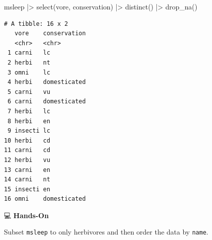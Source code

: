 \documentclass[
  letterpaper,
  DIV=11,
  numbers=noendperiod]{scrreprt}
\newenvironment{Shaded}{\begin{snugshade}}{\end{snugshade}}
\newcommand{\FunctionTok}[1]{\textcolor[rgb]{0.28,0.35,0.67}{#1}}
\newcommand{\NormalTok}[1]{\textcolor[rgb]{0.00,0.23,0.31}{#1}}
\newcommand{\SpecialCharTok}[1]{\textcolor[rgb]{0.37,0.37,0.37}{#1}}
\begin{document}
\begin{tcolorbox}[enhanced jigsaw, colbacktitle=quarto-callout-tip-color!10!white, opacitybacktitle=0.6, breakable, left=2mm, leftrule=.75mm, toprule=.15mm, toptitle=1mm, bottomtitle=1mm, colframe=quarto-callout-tip-color-frame, opacityback=0, coltitle=black, arc=.35mm, titlerule=0mm, colback=white, bottomrule=.15mm, title=\textcolor{quarto-callout-tip-color}{\faLightbulb}\hspace{0.5em}{Answer}, rightrule=.15mm]

\begin{Shaded}
\begin{Highlighting}[]
\NormalTok{msleep }\SpecialCharTok{|\textgreater{}} 
  \FunctionTok{select}\NormalTok{(vore, conservation) }\SpecialCharTok{|\textgreater{}}
  \FunctionTok{distinct}\NormalTok{() }\SpecialCharTok{|\textgreater{}}
  \FunctionTok{drop\_na}\NormalTok{()}
\end{Highlighting}
\end{Shaded}

\begin{verbatim}
# A tibble: 16 x 2
   vore    conservation
   <chr>   <chr>       
 1 carni   lc          
 2 herbi   nt          
 3 omni    lc          
 4 herbi   domesticated
 5 carni   vu          
 6 carni   domesticated
 7 herbi   lc          
 8 herbi   en          
 9 insecti lc          
10 herbi   cd          
11 carni   cd          
12 herbi   vu          
13 carni   en          
14 carni   nt          
15 insecti en          
16 omni    domesticated
\end{verbatim}

\end{tcolorbox}

💻 \textbf{Hands-On}

Subset \texttt{msleep} to only herbivores and then order the data by
\texttt{name}.
\end{document}
